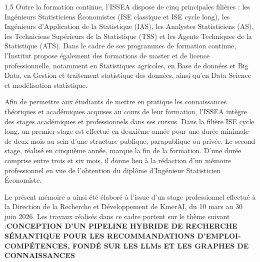 \documentclass[12pt,twoside]{report}
\begin{document}
\begin{singlespace}
\begin{spacing}{1.5}
Outre la formation continue, l'ISSEA dispose de cinq principales filières : les Ingénieurs Statisticiens Économistes (ISE classique et ISE cycle long), les Ingénieurs d'Application de la Statistique (IAS), les Analystes Statisticiens (AS), les Techniciens Supérieurs de la Statistique (TSS) et les Agents Techniques de la Statistique (ATS). Dans le cadre de ses programmes de formation continue, l'Institut propose également des formations de master et de licence professionnelle, notamment en Statistiques agricoles, en Base de données et Big Data, en Gestion et traitement statistique des données, ainsi qu'en Data Science et modélisation statistique.

Afin de permettre aux étudiants de mettre en pratique les connaissances théoriques et académiques acquises au cours de leur formation, l'ISSEA intègre des stages académiques et professionnels dans ses cursus. Dans la filière ISE cycle long, un premier stage est effectué en deuxième année pour une durée minimale de deux mois au sein d'une structure publique, parapublique ou privée. Le second stage, réalisé en cinquième année, marque la fin de la formation. D'une durée comprise entre trois et six mois, il donne lieu à la rédaction d'un mémoire professionnel en vue de l'obtention du diplôme d'Ingénieur Statisticien Économiste.

Le présent mémoire a ainsi été élaboré à l'issue d'un stage professionnel effectué à la Direction de la Recherche et Développement de KmerAI, du 10 mars au 30 juin 2026. Les travaux réalisés dans ce cadre portent sur le thème suivant :\textbf{CONCEPTION D'UN PIPELINE HYBRIDE DE RECHERCHE SÉMANTIQUE POUR LES RECOMMANDATIONS D'EMPLOI-COMPÉTENCES, FONDÉ SUR LES LLMs ET LES GRAPHES DE CONNAISSANCES}
\end{spacing}


\end{singlespace}
\end{document}
